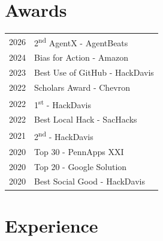 \documentclass[]{deedy-resume-openfont}
\begin{document}
\hfill
\begin{minipage}[t]{0.48\textwidth}

\section{Awards}
\begin{tabular}{rl}
2026 & 2\textsuperscript{nd} AgentX - AgentBeats\\
2024 & Bias for Action - Amazon\\
2023 & Best Use of GitHub - HackDavis\\
2022 & Scholars Award - Chevron\\
2022 & 1\textsuperscript{st} - HackDavis\\
2022 & Best Local Hack - SacHacks\\
2021 & 2\textsuperscript{nd} - HackDavis\\
2020 & Top 30 - PennApps XXI\\
2020 & Top 20 - Google Solution\\
2020 & Best Social Good - HackDavis\\
\end{tabular}

\end{minipage}
\sectionsep

\section{Experience}
\end{document}
